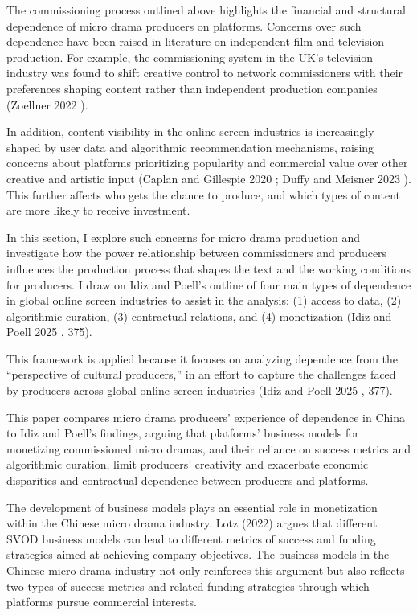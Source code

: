 \documentclass[10pt,a4paper]{article}
\begin{document}
The commissioning process outlined above highlights the financial and structural dependence of micro drama producers on platforms. Concerns over such dependence have been raised in literature on independent film and television production. For example, the commissioning system in the UK’s television industry was found to shift creative control to network commissioners with their preferences shaping content rather than independent production companies (Zoellner 2022 ).\par
In addition, content visibility in the online screen industries is increasingly shaped by user data and algorithmic recommendation mechanisms, raising concerns about platforms prioritizing popularity and commercial value over other creative and artistic input (Caplan and Gillespie 2020 ; Duffy and Meisner 2023 ). This further affects who gets the chance to produce, and which types of content are more likely to receive investment.\par
In this section, I explore such concerns for micro drama production and investigate how the power relationship between commissioners and producers influences the production process that shapes the text and the working conditions for producers. I draw on Idiz and Poell’s outline of four main types of dependence in global online screen industries to assist in the analysis: (1) access to data, (2) algorithmic curation, (3) contractual relations, and (4) monetization (Idiz and Poell 2025 , 375).\par
This framework is applied because it focuses on analyzing dependence from the “perspective of cultural producers,” in an effort to capture the challenges faced by producers across global online screen industries (Idiz and Poell 2025 , 377).\par
This paper compares micro drama producers’ experience of dependence in China to Idiz and Poell’s findings, arguing that platforms’ business models for monetizing commissioned micro dramas, and their reliance on success metrics and algorithmic curation, limit producers’ creativity and exacerbate economic disparities and contractual dependence between producers and platforms.\par
The development of business models plays an essential role in monetization within the Chinese micro drama industry. Lotz (2022) argues that different SVOD business models can lead to different metrics of success and funding strategies aimed at achieving company objectives. The business models in the Chinese micro drama industry not only reinforces this argument but also reflects two types of success metrics and related funding strategies through which platforms pursue commercial interests.\par
\end{document}
